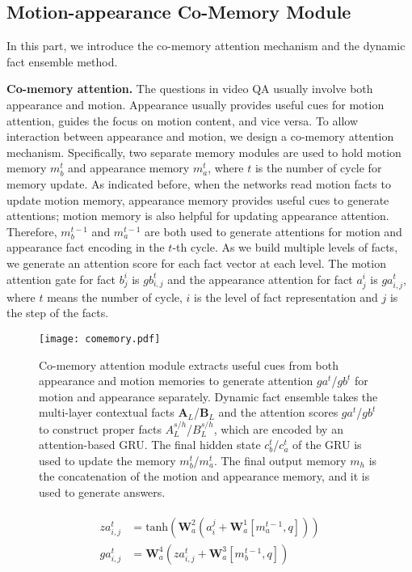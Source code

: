 \documentclass[10pt,twocolumn,letterpaper]{article}
\begin{document}
\subsection{Motion-appearance Co-Memory Module}
In this part, we introduce the co-memory attention mechanism and the dynamic fact ensemble method. 



\textbf{Co-memory attention.} The questions in video QA usually involve both appearance and motion. 
Appearance usually provides useful cues for motion attention, \ie guides the focus on motion content, and vice versa. To allow interaction between appearance and motion,
we design a co-memory attention mechanism. Specifically, two separate memory modules are used to hold motion memory $m_b^t$ and appearance memory $m_a^t$, where $t$ is the number of cycle for memory update. As indicated before, when the networks read motion facts to update motion memory, appearance memory provides useful cues to generate attentions; motion memory is also helpful for updating appearance attention. Therefore, $m_b^{t-1}$ and $m_a^{t-1}$ are both used to generate attentions for motion and appearance fact encoding in the $t$-th cycle. As we build multiple levels of facts, we generate an attention score for each fact vector at each level. The motion attention gate for fact $b_j^i$  is $gb_{i,j}^t$ and the appearance attention for fact  $a_j^i$ is $ga_{i,j}^t$, where $t$ means the number of cycle, $i$ is the level of fact representation and $j$ is the step of the facts.
\begin{figure}[]
  \centering
    \texttt{[image: comemory.pdf]}
    \caption{Co-memory attention module extracts useful cues from both appearance and motion memories to generate attention $ga^t$/$gb^t$ for motion and appearance separately. Dynamic fact ensemble takes the multi-layer contextual facts $\mathbf A_L$/$\mathbf B_L$ and the attention scores $ga^t$/$gb^t$ to construct proper facts $A_L^{s/h}$/$B_L^{s/h}$, which are encoded by an attention-based GRU. The final hidden state $c_b^t$/$c_a^t$ of the GRU is used to update the memory $m_b^t$/$m_a^t$. The final output memory $m_h$ is the concatenation of the motion and appearance memory, and it is used to generate answers. }
      \label{fig:comemory}
\end{figure}
\begin{align}
\begin{split}
    za_{i,j}^t&=\mbox{tanh}\left (\mathbf W_a^2 \left ( a^j_i+\mathbf W_a^1 [m_a^{t-1},q] \right ) \right ) \\
    ga_{i,j}^t&=\mathbf W_a^4 \left ( za_{i,j}^t+\mathbf W_a^3 [m_b^{t-1}, q] \right ) 
\end{split}
\end{align} 
\end{document}
